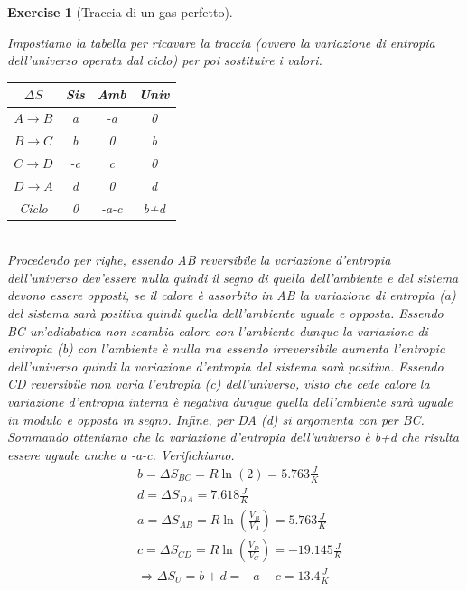 \documentclass[10pt,a4paper]{article}
\newtheorem{exercise}{Exercise}
\begin{document}
\begin{exercise}[Traccia di un gas perfetto]
\begin{enumerate}
Impostiamo la tabella per ricavare la traccia (ovvero la variazione di entropia dell'universo operata dal ciclo) per poi sostituire i valori. 
\begin{table}[h!]
	\begin{center}
		\begin{tabular}{ || c| c | c| c|| }
			\hline
			\(\Delta S\) & Sis& Amb& Univ\\
			\hline
			\(A\rightarrow B\)& a  &-a  &0  \\
			\(B\rightarrow C\)& b   &0   &b\\
			\(C\rightarrow D\)& -c    &c   &0\\
			\(D\rightarrow A\)& d   &0   &d\\
			\hline
			Ciclo             & 0      & -a-c & b+d  \\
			\hline
		\end{tabular}
	\end{center}
\end{table}\\
Procedendo per righe, essendo AB reversibile la variazione d'entropia dell'universo dev'essere nulla quindi il segno di quella dell'ambiente e del sistema devono essere opposti, se il calore è assorbito in AB la variazione di entropia (a) del sistema sarà positiva quindi quella dell'ambiente uguale e opposta. Essendo BC un'adiabatica non scambia calore con l'ambiente dunque la variazione di entropia (b) con l'ambiente è nulla ma essendo irreversibile aumenta l'entropia dell'universo quindi la variazione d'entropia del sistema sarà positiva. Essendo CD reversibile non varia l'entropia (c) dell'universo, visto che cede calore la variazione d'entropia interna è negativa dunque quella dell'ambiente sarà uguale in modulo e opposta in segno. Infine, per DA (d) si argomenta con per BC. Sommando otteniamo che la variazione d'entropia dell'universo è b+d che risulta essere uguale anche a -a-c. Verifichiamo.
\begin{align*}
&b =\Delta S_{BC}=R\ln\left(2\right)=5.763 \frac{J}{K}\\
&d =\Delta S_{DA}=7.618 \frac{J}{K}\\
&a =\Delta S_{AB}=R\ln\left(\frac{V_{B}}{V_{A}}\right)=5.763 \frac{J}{K}\\
&c =\Delta S_{CD}=R\ln\left(\frac{V_{D}}{V_{C}}\right)=-19.145 \frac{J}{K}\\
&\Rightarrow \Delta S_U = b+d = -a-c = 13.4\frac{J}{K}
\end{align*}
\end{enumerate}
\end{exercise}
\end{document}
